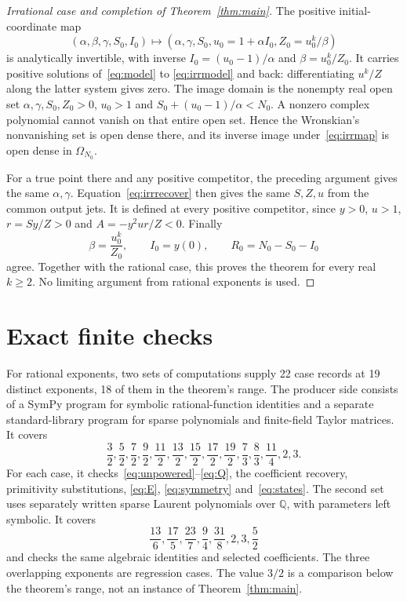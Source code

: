 \documentclass[10pt,a4paper]{article}
\theoremstyle{definition}\newtheorem{definition}[theorem]{Definition}
\begin{document}
\begin{proof}[Irrational case and completion of Theorem~\ref{thm:main}]
The positive initial-coordinate map
\begin{equation}
(\alpha,\beta,\gamma,S_0,I_0)\longmapsto
(\alpha,\gamma,S_0,u_0=1+\alpha I_0,Z_0=u_0^k/\beta)
\label{eq:irrmap}
\end{equation}
is analytically invertible, with inverse
$I_0=(u_0-1)/\alpha$ and $\beta=u_0^k/Z_0$.
It carries positive solutions of~\eqref{eq:model} to
\eqref{eq:irrmodel} and back: differentiating $u^k/Z$ along the latter
system gives zero. The image domain is the nonempty real open set
$\alpha,\gamma,S_0,Z_0>0$, $u_0>1$ and
$S_0+(u_0-1)/\alpha<N_0$. A nonzero complex polynomial cannot vanish
on that entire open set. Hence the Wronskian's nonvanishing set is
open dense there, and its inverse image under~\eqref{eq:irrmap} is
open dense in $\Omega_{N_0}$.

For a true point there and any positive competitor, the preceding
argument gives the same $\alpha,\gamma$. Equation~\eqref{eq:irrrecover}
then gives the same $S,Z,u$ from the common output jets. It is defined
at every positive competitor, since
$y>0$, $u>1$, $r=Sy/Z>0$ and $A=-y^2ur/Z<0$.
Finally
\[
\beta=\frac{u_0^k}{Z_0},\qquad I_0=y(0),\qquad
R_0=N_0-S_0-I_0
\]
agree. Together with the rational case, this proves the theorem for
every real $k\geq2$. No limiting argument from rational exponents is
used.
\end{proof}
\section{Exact finite checks}
\label{sec:checks}
For rational exponents, two sets of computations supply 22 case records at 19 distinct exponents,
18 of them in the theorem's range. The producer side consists of a
SymPy program for symbolic rational-function identities and a separate
standard-library program for sparse polynomials and finite-field
Taylor matrices. It covers
\[
\frac32,\frac52,\frac72,\frac92,\frac{11}2,\frac{13}2,
\frac{15}2,\frac{17}2,\frac{19}2,\frac73,\frac83,\frac{11}4,2,3.
\]
For each case, it checks~\eqref{eq:unpowered}--\eqref{eq:Q}, the
coefficient recovery, primitivity substitutions,
\eqref{eq:E}, \eqref{eq:symmetry} and~\eqref{eq:states}.
The second set uses separately written sparse Laurent polynomials over
$\mathbb Q$, with parameters left symbolic. It covers
\[
\frac{13}6,\frac{17}5,\frac{23}7,\frac94,\frac{31}8,2,3,\frac52
\]
and checks the same algebraic identities and selected coefficients.
The three overlapping exponents are regression cases. The value
$3/2$ is a comparison below the theorem's range, not an instance of
Theorem~\ref{thm:main}.
\end{document}
